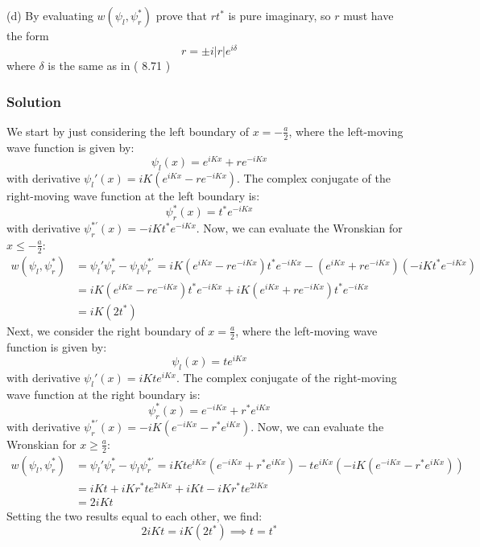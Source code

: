 \documentclass[12pt]{article}
\begin{document}
\subsection{}
(d) By evaluating $w\left(\psi_l, \psi_r^*\right)$ prove that $r t^*$ is pure imaginary, so $r$ must have the form
$$
r= \pm i|r| e^{i \delta}
$$
where $\delta$ is the same as in ( 8.71 )
\subsubsection{Solution}
We start by just considering the left boundary of $x = -\frac{a}{2}$, where the left-moving wave function is given by:
\begin{equation}
    \psi_l(x) = e^{iKx} + re^{-iKx}
\end{equation}
with derivative $\psi_l'(x) = iK\left(e^{iKx} - re^{-iKx}\right)$. The complex conjugate of the right-moving wave function at the left boundary is:
\begin{equation}
    \psi_r^*(x) = t^*e^{-iKx}
\end{equation}
with derivative $\psi_r^{*'}(x) = -iKt^*e^{-iKx}$. Now, we can evaluate the Wronskian for $x \leq -\frac{a}{2}$:
\begin{align}
    w(\psi_l, \psi_r^*) &= \psi_l'\psi_r^* - \psi_l\psi_r^{*'} = iK\left(e^{iKx} - re^{-iKx}\right)t^*e^{-iKx} - \left(e^{iKx} + re^{-iKx}\right)\left(-iKt^*e^{-iKx}\right)\\
    &= iK\left(e^{iKx} - re^{-iKx}\right)t^*e^{-iKx} + iK\left(e^{iKx} + re^{-iKx}\right)t^*e^{-iKx}\\
    &= iK\left(2t^*\right)
\end{align}
Next, we consider the right boundary of $x = \frac{a}{2}$, where the left-moving wave function is given by:
\begin{equation}
    \psi_l(x) = te^{iKx}
\end{equation}
with derivative $\psi_l'(x) = iKte^{iKx}$. The complex conjugate of the right-moving wave function at the right boundary is:
\begin{equation}
    \psi_r^*(x) = e^{-iKx} + r^*e^{iKx}
\end{equation}
with derivative $\psi_r^{*'}(x) = -iK\left(e^{-iKx} - r^*e^{iKx}\right)$. Now, we can evaluate the Wronskian for $x \geq \frac{a}{2}$:
\begin{align}
    w(\psi_l, \psi_r^*) &= \psi_l'\psi_r^* - \psi_l\psi_r^{*'} = iKte^{iKx}\left(e^{-iKx} + r^*e^{iKx}\right) - te^{iKx}\left(-iK\left(e^{-iKx} - r^*e^{iKx}\right)\right)\\
    &= iKt + iKr^*t e^{2iKx} + iKt - iKr^*t e^{2iKx}\\
    &= 2iKt
\end{align}
Setting the two results equal to each other, we find:
\begin{equation}
    2iKt = iK\left(2t^*\right) \implies t = t^*
\end{equation}
\end{document}
